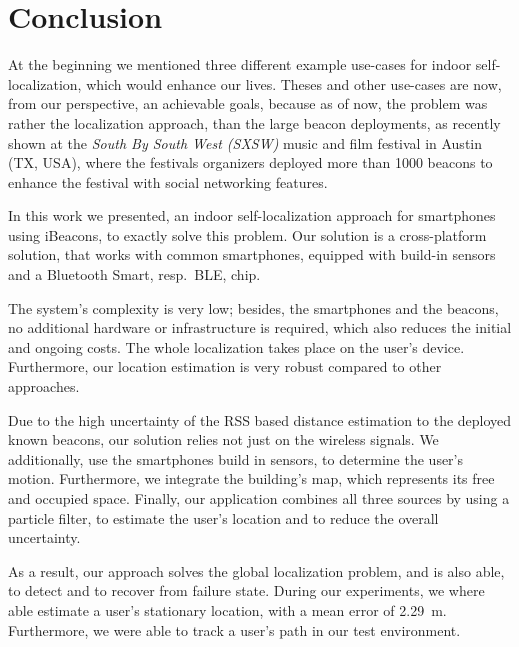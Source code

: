 \chapter{Conclusion} \label{chap:conclusion}
At the beginning we mentioned three different example use-cases for indoor self-localization, which would enhance our lives. Theses and other use-cases are now, from our perspective, an achievable goals, because as of now, the problem was rather the localization approach, than the large beacon deployments, as recently shown at the \emph{South By South West (SXSW)} music and film festival in Austin (TX, USA), where the festivals organizers deployed more than 1000 beacons to enhance the festival with social networking features.

In this work we presented, an indoor self-localization approach for smartphones using iBeacons, to exactly solve this problem. Our solution is a cross-platform solution, that works with common smartphones, equipped with build-in sensors and a Bluetooth Smart, resp.\ \acl{BLE}, chip.

The system's complexity is very low; besides, the smartphones and the beacons, no additional hardware or infrastructure is required, which also reduces the initial and ongoing costs. The whole localization takes place on the user's device. Furthermore, our location estimation is very robust compared to other approaches.

Due to the high uncertainty of the \acs{RSS} based distance estimation to the deployed known beacons, our solution relies not just on the wireless signals. We additionally, use the smartphones build in sensors, to determine the user's motion. Furthermore, we integrate the building's map, which represents its free and occupied space. Finally, our application combines all three sources by using a particle filter, to estimate the user's location and to reduce the overall uncertainty.

As a result, our approach solves the global localization problem, and is also able, to detect and to recover from failure state. During our experiments, we where able estimate a user's stationary location, with a mean error of 2.29~m. Furthermore, we were able to track a user's path in our test environment. 



